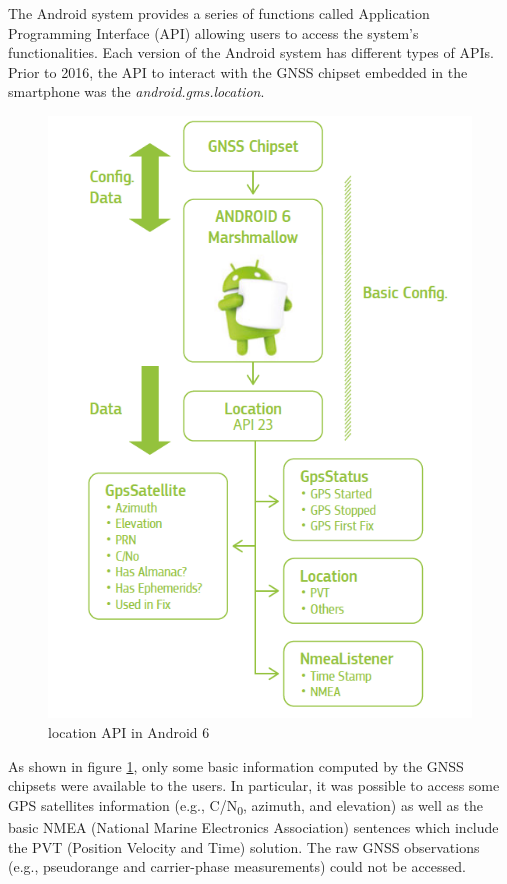 The Android system provides a series of functions called
Application Programming Interface (API) allowing users
to access the system's functionalities. Each version of the
Android system has different types of APIs.
Prior to 2016, the API to interact with the GNSS chipset embedded in the smartphone was the \textit{android.gms.location}. 

\begin{figure}[H] 
	\centering
	\includegraphics[scale=0.75]{fig/android6API.png} 
	\caption{location API in Android 6}
	\label{FIG:locapiand6} 
\end{figure}

As shown in figure \ref{FIG:locapiand6}, only some basic information computed by the GNSS chipsets were available to the
users. In particular, it was possible to access some GPS satellites information (e.g., C/N\textsubscript{0}, azimuth, and elevation) as well as the basic NMEA (National
Marine Electronics Association) sentences which include
the PVT (Position Velocity and Time) solution. The raw GNSS observations (e.g., pseudorange
and carrier-phase measurements) could not be accessed.  

